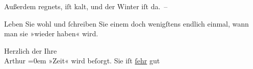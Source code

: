 \pstart
           {\pb}Außerdem regnets, iſt kalt, und der Winter iſt
               da. –\pend
           
\pstart
           Leben Sie wohl und{ }ſchreiben Sie einem doch wenigſtens endlich einmal, wann man sie
               »wieder haben« wird.\pend
           
\pstart
           Herzlich der Ihre{\\[\baselineskip]}\spacefill\mbox{Arthur}\pend
           \leftskip=0em{}
\pstart
           \noindent{}»Zeit« wird beſorgt. Sie iſt \uline{ſehr} gut\pend
           \endnumbering{}  \newcommand{\dateiname}{L00382}\newcommand{\titel}{Arthur Schnitzler an Richard Beer-Hofmann, 15. 10. 1894}\newcommand{\editorInnen}{Martin Anton Müller und Gerd-Hermann Susen}
